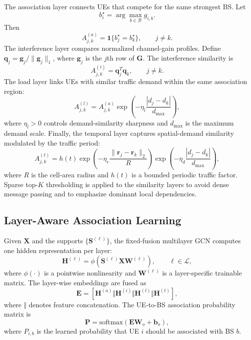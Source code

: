\documentclass[journal]{IEEEtran}
\begin{document}
The association layer connects UEs that compete for the same strongest BS. Let
\begin{equation}
    b_i^{\star}=\arg\max_{b\in\mathcal{B}} g_{i,b}.
\end{equation}
Then
\begin{equation}
    A_{j,k}^{(a)} =
    \mathbf{1}\{b_j^{\star}=b_k^{\star}\},
    \qquad j\neq k.
\end{equation}
The interference layer compares normalized channel-gain profiles. Define
$\mathbf{q}_j=\mathbf{g}_j/\|\mathbf{g}_j\|_1$, where $\mathbf{g}_j$ is the
$j$th row of $\mathbf{G}$. The interference similarity is
\begin{equation}
    A_{j,k}^{(i)} = \mathbf{q}_j^T\mathbf{q}_k,\qquad j\neq k.
\end{equation}
The load layer links UEs with similar traffic demand within the same
association region:
\begin{equation}
    A_{j,k}^{(l)} =
    A_{j,k}^{(a)}
    \exp\left(-\eta_l\frac{|d_j-d_k|}{d_{\max}}\right),
\end{equation}
where $\eta_l>0$ controls demand-similarity sharpness and $d_{\max}$ is the
maximum demand scale. Finally, the temporal layer captures spatial-demand
similarity modulated by the traffic period:
\begin{equation}
    A_{j,k}^{(t)} =
    h(t)\exp\left(-\eta_r\frac{\|\mathbf{r}_j-\mathbf{r}_k\|_2}{R}\right)
    \exp\left(-\eta_d\frac{|d_j-d_k|}{d_{\max}}\right),
\end{equation}
where $R$ is the cell-area radius and $h(t)$ is a bounded periodic traffic
factor. Sparse top-$K$ thresholding is applied to the similarity layers to
avoid dense message passing and to emphasize dominant local dependencies.

\subsection{Layer-Aware Association Learning}
Given $\mathbf{X}$ and the supports $\{\mathbf{S}^{(\ell)}\}$, the fixed-fusion
multilayer GCN computes one hidden representation per layer:
\begin{equation}
    \mathbf{H}^{(\ell)}
    =\phi\left(\mathbf{S}^{(\ell)}\mathbf{X}\mathbf{W}^{(\ell)}\right),
    \qquad \ell\in\mathcal{L},
    \label{eq:layer_gcn}
\end{equation}
where $\phi(\cdot)$ is a pointwise nonlinearity and
$\mathbf{W}^{(\ell)}$ is a layer-specific trainable matrix. The layer-wise
embeddings are fused as
\begin{equation}
    \mathbf{E} =
    \left[\mathbf{H}^{(a)}\Vert\mathbf{H}^{(i)}
    \Vert\mathbf{H}^{(l)}\Vert\mathbf{H}^{(t)}\right],
    \label{eq:fixed_fusion}
\end{equation}
where $\Vert$ denotes feature concatenation. The UE-to-BS association
probability matrix is
\begin{equation}
    \mathbf{P} =
    \mathrm{softmax}\left(\mathbf{E}\mathbf{W}_o+\mathbf{b}_o\right),
    \label{eq:association_prob}
\end{equation}
where $P_{i,b}$ is the learned probability that UE $i$ should be associated
with BS $b$.
\end{document}
